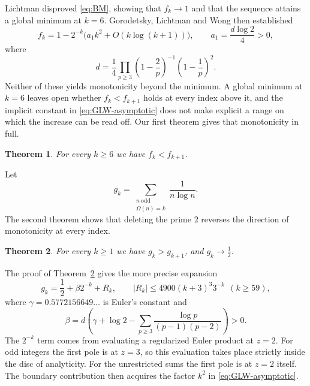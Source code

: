 \documentclass[11pt]{amsart}
\theoremstyle{plain}
\newtheorem{theorem}{Theorem}[section]
\theoremstyle{definition}
\newcommand{\abs}[1]{\lvert #1\rvert}
\begin{document}
Lichtman \cite{Lichtman19} disproved \eqref{eq:BM}, showing that $f_k\to1$ and
that the sequence attains a global minimum at $k=6$. Gorodetsky, Lichtman and
Wong \cite{GLW} then established
\begin{equation}\label{eq:GLW-asymptotic}
  f_k=1-2^{-k}\bigl(a_1k^2+O(k\log(k+1))\bigr),
  \qquad a_1=\frac{d\log2}{4}>0,
\end{equation}
where
\begin{equation}\label{eq:d-def}
  d=\frac14\prod_{p\geq3}\left(1-\frac2p\right)^{-1}
                    \left(1-\frac1p\right)^2.
\end{equation}
Neither of these yields monotonicity beyond the minimum. A global minimum at
$k=6$ leaves open whether $f_k<f_{k+1}$ holds at every index above it, and the
implicit constant in \eqref{eq:GLW-asymptotic} does not make explicit a range
on which the increase can be read off. Our first theorem gives that
monotonicity in full.

\begin{theorem}\label{thm:main-full}
For every $k\geq6$ we have $f_k<f_{k+1}$.
\end{theorem}

Let
\[
  g_k
   =\sum_{\substack{n\ \mathrm{odd}\\ \Omega(n)=k}}\frac1{n\log n}.
\]
The second theorem shows that deleting the prime $2$ reverses the direction of
monotonicity at every index.

\begin{theorem}\label{thm:main-odd}
For every $k\geq1$ we have $g_k>g_{k+1}$, and $g_k\to\tfrac12$.
\end{theorem}

The proof of Theorem~\ref{thm:main-odd} gives the more precise expansion
\begin{equation}\label{eq:odd-intro-expansion}
  g_k=\frac12+\beta2^{-k}+R_k,
  \qquad \abs{R_k}\leq4900(k+3)^3 3^{-k}\ \ (k\geq59),
\end{equation}
where $\gamma=0.5772156649\ldots$ is Euler's constant and
\begin{equation}\label{eq:beta-intro}
  \beta=d\left(\gamma+\log2-
  \sum_{p\geq3}\frac{\log p}{(p-1)(p-2)}\right)>0.
\end{equation}
The $2^{-k}$ term comes from evaluating a regularized Euler product at $z=2$.
For odd integers the first pole is at $z=3$, so this evaluation takes place
strictly inside the disc of analyticity. For the unrestricted sums the first
pole is at $z=2$ itself. The boundary contribution then acquires the factor
$k^2$ in \eqref{eq:GLW-asymptotic}.
\end{document}
